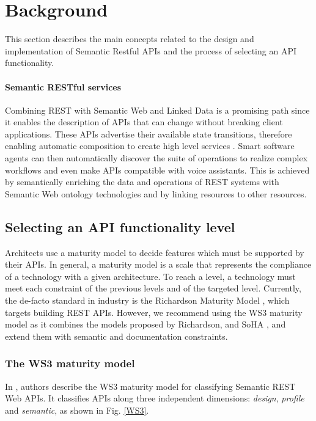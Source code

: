 \section{Background} \label{sec:background}

This section describes the main concepts related to the design and implementation of Semantic Restful APIs and the process of selecting an API functionality.

\paragraph{Semantic RESTful services}
Combining REST with Semantic Web and Linked Data is a promising path since it enables the description of APIs that can change without breaking client applications. These APIs advertise their available state transitions, therefore enabling automatic composition to create high level services \cite{alarcon2015rest}. Smart software agents can then automatically discover the suite of operations to realize complex workflows and even make APIs compatible with voice assistants. This is achieved by semantically enriching the data and operations of REST systems with Semantic Web ontology technologies and by linking resources to other resources.

\subsection{Selecting an API functionality level}\label{sec:maturityLevel}

Architects use a maturity model to decide features which must be supported by their APIs. In general, a maturity model is a scale that represents the compliance of a technology with a given architecture. To reach a level, a technology must meet each constraint of the previous levels and of the targeted level.
Currently, the de-facto standard in industry is the Richardson Maturity Model \cite{RichardsonMaturityModel}, which targets building REST APIs. However, we recommend using the WS3 maturity model \cite{7195633} as it combines the models proposed by Richardson, and SoHA \cite{SoHA}, and extend them with semantic and documentation constraints.

\subsubsection{The WS3 maturity model}

In \cite{7195633}, authors describe the WS3 maturity model for classifying Semantic REST Web APIs. 
It classifies APIs along three independent dimensions: \textit{design}, \textit{profile} and \textit{semantic}, as shown in Fig. \ref{WS3}.

